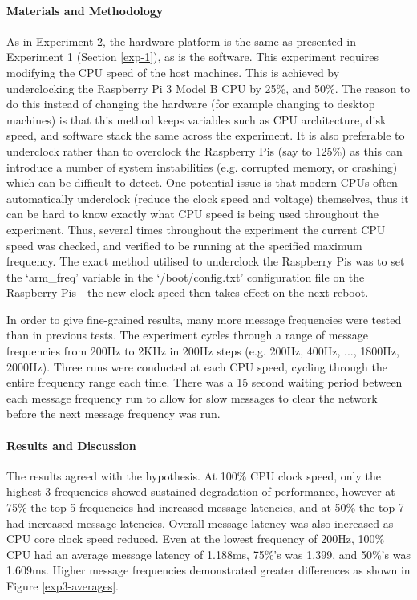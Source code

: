 \documentclass[../dissertation.tex]{subfiles}
\begin{document}
\paragraph{Materials and Methodology} As in Experiment 2, the hardware platform is the same as presented in Experiment 1 (Section \ref{exp-1}), as is the software\cite{Experiment1NoEchoDelayCode}. This experiment requires modifying the CPU speed of the host machines. This is achieved by underclocking the Raspberry Pi 3 Model B CPU by 25\%, and 50\%. The reason to do this instead of changing the hardware (for example changing to desktop machines) is that this method keeps variables such as CPU architecture, disk speed, and software stack the same across the experiment. It is also preferable to underclock rather than to overclock the Raspberry Pis (say to 125\%) as this can introduce a number of system instabilities (e.g. corrupted memory, or crashing) which can be difficult to detect. One potential issue is that modern CPUs often automatically underclock (reduce the clock speed and voltage) themselves, thus it can be hard to know exactly what CPU speed is being used throughout the experiment. Thus, several times throughout the experiment the current CPU speed was checked, and verified to be running at the specified maximum frequency. The exact method utilised to underclock the Raspberry Pis was to set the `arm\_freq' variable in the `/boot/config.txt' configuration file on the Raspberry Pis - the new clock speed then takes effect on the next reboot.

In order to give fine-grained results, many more message frequencies were tested than in previous tests. The experiment cycles through a range of message frequencies from 200Hz to 2KHz in 200Hz steps (e.g. 200Hz, 400Hz, ..., 1800Hz, 2000Hz). Three runs were conducted at each CPU speed, cycling through the entire frequency range each time. There was a 15 second waiting period between each message frequency run to allow for slow messages to clear the network before the next message frequency was run.

\paragraph{Results and Discussion} The results agreed with the hypothesis. At 100\% CPU clock speed, only the highest 3 frequencies showed sustained degradation of performance, however at 75\% the top 5 frequencies had increased message latencies, and at 50\% the top 7 had increased message latencies. Overall message latency was also increased as CPU core clock speed reduced. Even at the lowest frequency of 200Hz, 100\% CPU had an average message latency of 1.188ms, 75\%'s was 1.399, and 50\%'s was 1.609ms. Higher message frequencies demonstrated greater differences as shown in Figure \ref{exp3-averages}.
\end{document}
